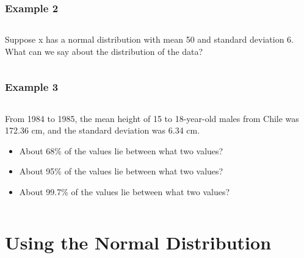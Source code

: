 \documentclass[12pt,twocolumn]{article}
\begin{document}
\begin{frame}[t]
 \frametitle{Example 2}
 \begin{columns}
  \begin{column}{0.5\textwidth}
   Suppose x has a normal distribution with mean 50 and standard deviation 6. What can we say about the distribution of the data?
  \end{column}
  \begin{column}{0.5\textwidth}
  \end{column}
 \end{columns}
\end{frame}

\begin{frame}[t]
 \frametitle{Example 3}
 \begin{columns}
  \begin{column}{0.5\textwidth}
    From 1984 to 1985, the mean height of 15 to 18-year-old males from Chile was 172.36 cm, and the standard deviation was 6.34 cm.
    \begin{itemize}
     \item About 68\% of the values lie between what two values?
     \item About 95\% of the values lie between what two values?
     \item About 99.7\% of the values lie between what two values?
    \end{itemize}
  \end{column}
  \begin{column}{0.5\textwidth}
  \end{column}
 \end{columns}
\end{frame}

\pagebreak
\section{Using the Normal Distribution}
\end{document}
